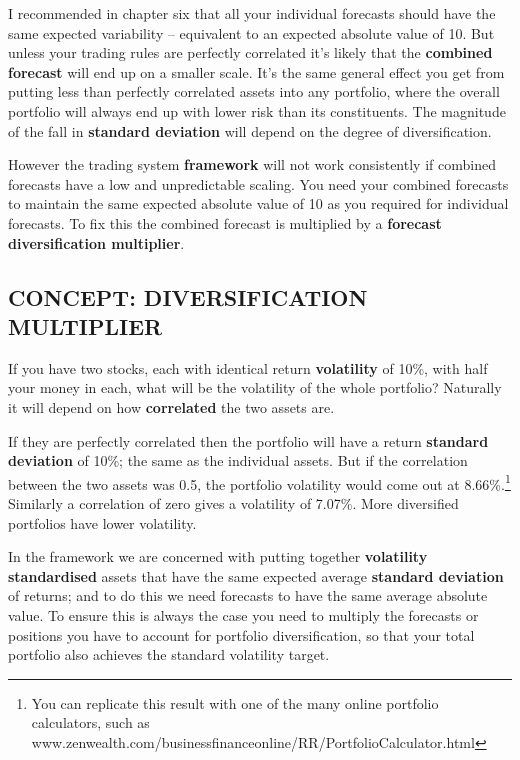I recommended in chapter six that all your individual forecasts should have the same expected variability -- equivalent to an expected absolute value of 10. But unless your trading rules are perfectly correlated it's likely that the \textbf{combined forecast} will end up on a smaller scale. It's the same general effect you get from putting less than perfectly correlated assets into any portfolio, where the overall portfolio will always end up with lower risk than its constituents. The magnitude of the fall in \textbf{standard deviation} will depend on the degree of diversification.

However the trading system \textbf{framework} will not work consistently if combined forecasts have a low and unpredictable scaling. You need your combined forecasts to maintain the same expected absolute value of 10 as you required for individual forecasts. To fix this the combined forecast is multiplied by a \textbf{forecast} \textbf{diversification multiplier}.

\subsection*{CONCEPT: DIVERSIFICATION MULTIPLIER}

If you have two stocks, each with identical return \textbf{volatility} of 10\%, with half your money in each, what will be the volatility of the whole portfolio? Naturally it will depend on how \textbf{correlated} the two assets are.

If they are perfectly correlated then the portfolio will have a return \textbf{standard deviation} of 10\%; the same as the individual assets. But if the correlation between the two assets was 0.5, the portfolio volatility would come out at 8.66\%.\footnote{You can replicate this result with one of the many online portfolio calculators, such as www.zenwealth.com/businessfinanceonline/RR/PortfolioCalculator.html} Similarly a correlation of zero gives a volatility of 7.07\%. More diversified portfolios have lower volatility.

In the framework we are concerned with putting together \textbf{volatility standardised} assets that have the same expected average \textbf{standard deviation} of returns; and to do this we need forecasts to have the same average absolute value. To ensure this is always the case you need to multiply the forecasts or positions you have to account for portfolio diversification, so that your total portfolio also achieves the standard volatility target.

